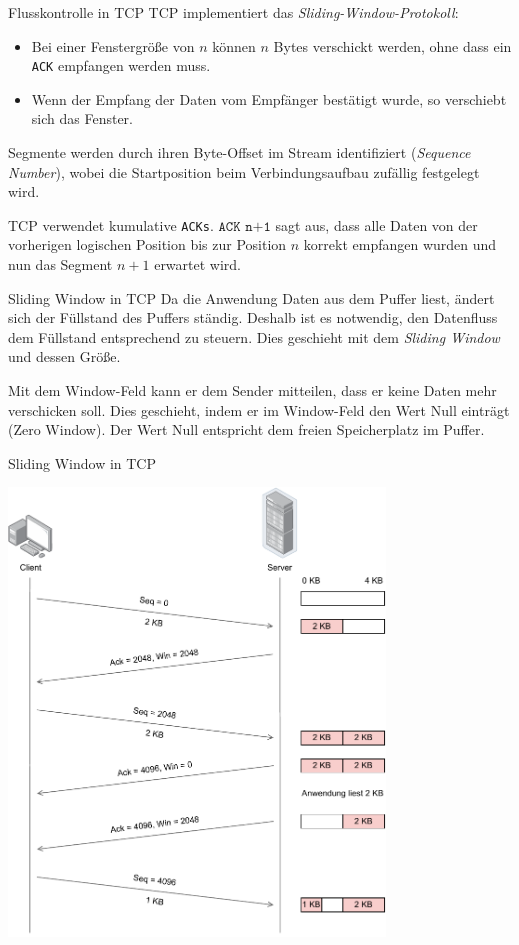 \begin{defi}{Flusskontrolle in TCP}
    TCP implementiert das \emph{Sliding-Window-Protokoll}:
    \begin{itemize}
        \item Bei einer Fenstergröße von $n$ können $n$ Bytes verschickt werden, ohne dass ein \texttt{ACK} empfangen werden muss.
        \item Wenn der Empfang der Daten vom Empfänger bestätigt wurde, so verschiebt sich das Fenster.
    \end{itemize}

    Segmente werden durch ihren Byte-Offset im Stream identifiziert (\emph{Sequence Number}), wobei die Startposition beim Verbindungsaufbau zufällig festgelegt wird.

    TCP verwendet kumulative \texttt{ACKs}. $\texttt{ACK n+1}$ sagt aus, dass alle Daten von der vorherigen logischen Position bis zur Position $n$ korrekt empfangen wurden und nun das Segment $n+1$ erwartet wird.
\end{defi}

\begin{defi}{Sliding Window in TCP}
    Da die Anwendung Daten aus dem Puffer liest, ändert sich der Füllstand des Puffers ständig.
    Deshalb ist es notwendig, den Datenfluss dem Füllstand entsprechend zu steuern.
    Dies geschieht mit dem \emph{Sliding Window} und dessen Größe.

    Mit dem Window-Feld kann er dem Sender mitteilen, dass er keine Daten mehr verschicken soll.
    Dies geschieht, indem er im Window-Feld den Wert Null einträgt (Zero Window).
    Der Wert Null entspricht dem freien Speicherplatz im Puffer.
\end{defi}

\begin{example}{Sliding Window in TCP}
    \begin{center}
        \includegraphics[width=0.75\textwidth]{includes/figures/example_tcp_window_management.pdf}
    \end{center}
\end{example}

